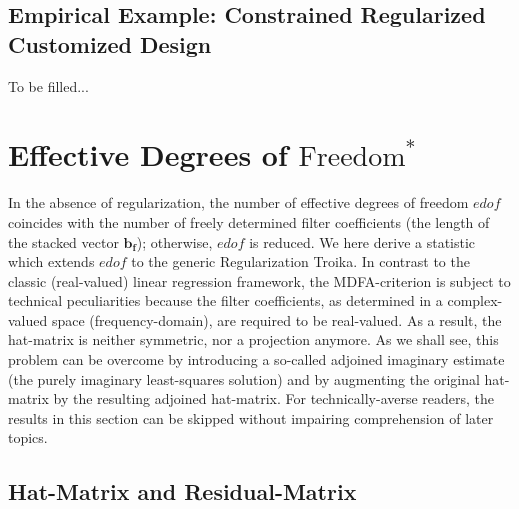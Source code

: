 \documentclass[a4paper]{book}
\begin{document}
\subsection{Empirical Example: Constrained Regularized Customized Design}

To be filled...


\section{Effective Degrees of $\textrm{Freedom}^*$}\label{reg_tr_eff_deg_free}

In the absence of regularization, the number of effective degrees of freedom $edof$ coincides with the number of freely determined filter coefficients (the length of the stacked vector $\mathbf{b_f}$); otherwise, $edof$ is reduced. We here derive a statistic which extends  $edof$ to the generic Regularization Troika. In contrast to the classic (real-valued) linear regression framework, the MDFA-criterion is subject to technical  peculiarities because the filter coefficients, as determined in a complex-valued space (frequency-domain), are required to be real-valued. As a result, the hat-matrix is neither symmetric, nor a projection anymore. As we shall see, this problem can be overcome by introducing a so-called adjoined imaginary estimate (the purely imaginary least-squares solution) and by augmenting the original hat-matrix by the resulting adjoined hat-matrix. For technically-averse readers, the results in this section can be skipped without impairing comprehension of later topics. %


\subsection{Hat-Matrix and Residual-Matrix}
\end{document}
